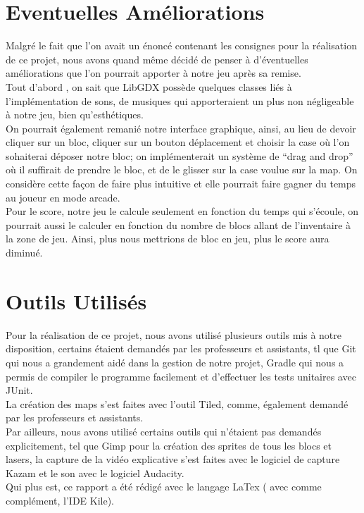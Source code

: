\documentclass[a4paper,10pt]{article}
\begin{document}
\section{Eventuelles Améliorations}
Malgré le fait que l'on avait un énoncé contenant les consignes pour la réalisation de ce projet, nous avons quand même décidé de penser à d'éventuelles
améliorations que l'on pourrait apporter à notre jeu après sa remise.\\
Tout d'abord , on sait que LibGDX possède quelques classes liés à l'implémentation de sons, de musiques qui apporteraient un plus
non négligeable à notre jeu, bien qu'esthétiques.\\
On pourrait également remanié notre interface graphique, ainsi, au lieu de devoir cliquer sur un bloc, cliquer sur un bouton déplacement
et choisir la case où l'on sohaiterai déposer notre bloc; on implémenterait un système de ``drag and drop'' où il suffirait de prendre le bloc,
et de le glisser sur la case voulue sur la map. On considère cette façon de faire plus intuitive et elle pourrait faire gagner du temps au joueur
en mode arcade.\\
Pour le score, notre jeu le calcule seulement en fonction du temps qui s'écoule, on pourrait aussi le calculer en fonction du nombre de blocs allant
de l'inventaire à la zone de jeu. Ainsi, plus nous mettrions de bloc en jeu, plus le score aura diminué.

\section{Outils Utilisés}
Pour la réalisation de ce projet, nous avons utilisé plusieurs outils mis à notre disposition, certains étaient demandés par les professeurs et assistants,
tl que Git qui nous a grandement aidé dans la gestion de notre projet, Gradle qui nous a permis de compiler le programme facilement et d'effectuer les tests unitaires
avec JUnit.\\
La création des maps s'est faites avec l'outil Tiled, comme, également demandé par les professeurs et assistants. \\

Par ailleurs, nous avons utilisé certains outils qui n'étaient pas demandés explicitement, tel que Gimp pour la création des sprites de tous les blocs et lasers,
la capture de la vidéo explicative s'est faites avec le logiciel de capture Kazam et le son avec le logiciel Audacity.\\
Qui plus est, ce rapport a été rédigé avec le langage LaTex ( avec comme complément, l'IDE Kile).
\end{document}
